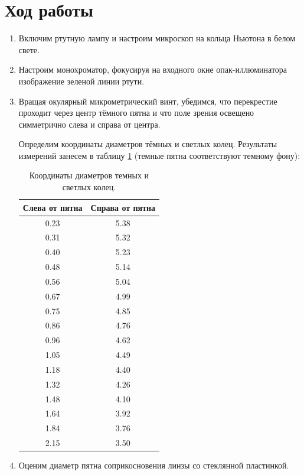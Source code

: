 \documentclass[a4paper, 12pt]{article}
\begin{document}
	\section{Ход работы}
	\begin{enumerate}
		\item Включим ртутную лампу и настроим микроскоп на кольца Ньютона в белом свете.
		\item Настроим монохроматор, фокусируя на входного окне опак-иллюминатора изображение зеленой линии ртути.
		\item Вращая окулярный микрометрический винт, убедимся, что перекрестие проходит через центр тёмного пятна и что поле зрения освещено симметрично слева и справа от центра.\par
			Определим координаты диаметров тёмных и светлых колец. Результаты измерений занесем в таблицу \ref{diameters_table} (темные пятна соответствуют темному фону):
			\begin{table}[h]
				\centering
				\begin{tabular}{|c|c|}
					\hline
					Слева от пятна & Справа от пятна\\
					\hline
					\rowcolor{Gray}
					0.23 & 5.38\\
					0.31 & 5.32\\
					\rowcolor{Gray}
					0.40 & 5.23\\
					0.48 & 5.14\\
					\rowcolor{Gray}
					0.56 & 5.04\\
					0.67 & 4.99\\
					\rowcolor{Gray}
					0.75 & 4.85\\
					0.86 & 4.76\\
					\rowcolor{Gray}
					0.96 & 4.62\\
					1.05 & 4.49\\
					\rowcolor{Gray}
					1.18 & 4.40\\
					1.32 & 4.26\\
					\rowcolor{Gray}
					1.48 & 4.10\\
					1.64 & 3.92\\
					\rowcolor{Gray}
					1.84 & 3.76\\
					2.15 & 3.50\\
					\hline
				\end{tabular}
				\caption{Координаты диаметров темных и светлых колец.}
				\label{diameters_table}
			\end{table}
		\item Оценим диаметр пятна соприкосновения линзы со стеклянной пластинкой.

\end{enumerate}
\end{document}
